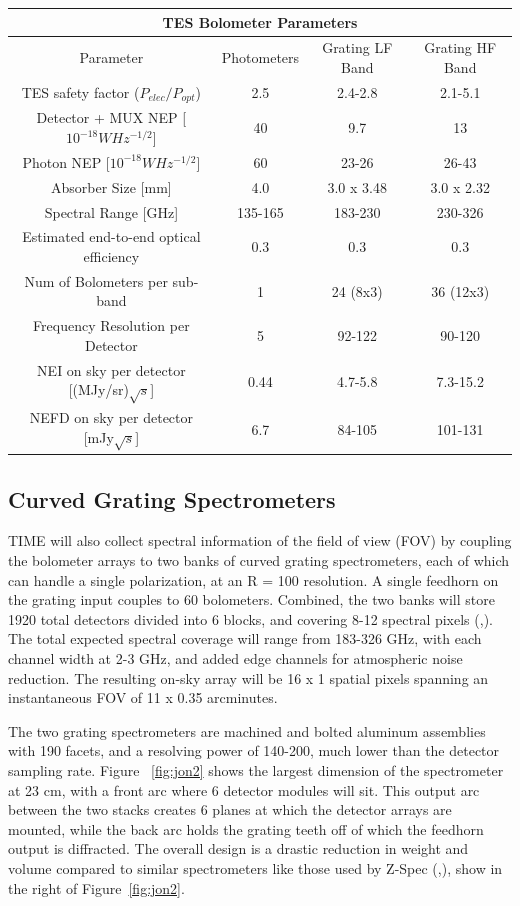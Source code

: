 \documentclass[manuscript]{aastex}
\begin{document}
\begin{center}
    \begin{tabular}{|c|c|c|c|}
    \hline
    \multicolumn{4}{c}{TES Bolometer Parameters} \\
    \hline
    \hline
    Parameter & Photometers & Grating LF Band & Grating HF Band \\
    \hline
    TES safety factor ($P_{elec}/P_{opt}$) & 2.5 & 2.4-2.8 & 2.1-5.1 \\
    Detector + MUX NEP [$10^{-18} W Hz^{-1/2}$] & 40 & 9.7 & 13 \\
    Photon NEP [$10^{-18} W Hz^{-1/2}$] & 60 & 23-26 & 26-43 \\
    Absorber Size [mm] & 4.0 & 3.0 x 3.48 & 3.0 x 2.32 \\
    Spectral Range [GHz] & 135-165 & 183-230 & 230-326 \\
    Estimated end-to-end optical efficiency & 0.3 & 0.3 & 0.3 \\
    Num of Bolometers per sub-band & 1 & 24 (8x3) & 36 (12x3) \\
    Frequency Resolution per Detector & 5 & 92-122 & 90-120 \\
    NEI on sky per detector [(MJy/sr)$\sqrt{s}$] & 0.44 & 4.7-5.8 & 7.3-15.2 \\
    NEFD on sky per detector [mJy$\sqrt{s}$] & 6.7 & 84-105 & 101-131 \\
    \hline
    \end{tabular}
\end{center}

\subsection{Curved Grating Spectrometers}
TIME will also collect spectral information of the field of view (FOV) by coupling the bolometer arrays to two banks of curved grating spectrometers, each of which can handle a single polarization, at an R = 100 resolution. A single feedhorn on the grating input couples to 60 bolometers. Combined, the two banks will store 1920 total detectors divided into 6 blocks, and covering 8-12 spectral pixels  (\cite{Crites2014},\cite{Hunacek2016}). The total expected spectral coverage will range from 183-326 GHz, with each channel width at 2-3 GHz, and added edge channels for atmospheric noise reduction. The resulting on-sky array will be 16 x 1 spatial pixels spanning an instantaneous FOV of 11 x 0.35 arcminutes.

The two grating spectrometers are machined and bolted aluminum assemblies with 190 facets, and a resolving power of 140-200, much lower than the detector sampling rate. Figure ~\ref{fig:jon2} shows the largest dimension of the spectrometer at 23 cm, with a front arc where 6 detector modules will sit. This output arc between the two stacks creates 6 planes at which the detector arrays are mounted, while the back arc holds the grating teeth off of which the feedhorn output is diffracted. The overall design is a drastic reduction in weight and volume compared to similar spectrometers like those used by Z-Spec (\cite{Bradford2004},\cite{Naylor2003}), show in the right of Figure~\ref{fig:jon2}.
\end{document}
